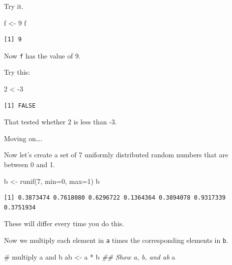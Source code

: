 \documentclass[
  letterpaper,
  DIV=11,
  numbers=noendperiod]{scrreprt}
\newenvironment{Shaded}{\begin{snugshade}}{\end{snugshade}}
\newcommand{\AttributeTok}[1]{\textcolor[rgb]{0.40,0.45,0.13}{#1}}
\newcommand{\CommentTok}[1]{\textcolor[rgb]{0.37,0.37,0.37}{#1}}
\newcommand{\DecValTok}[1]{\textcolor[rgb]{0.68,0.00,0.00}{#1}}
\newcommand{\DocumentationTok}[1]{\textcolor[rgb]{0.37,0.37,0.37}{\textit{#1}}}
\newcommand{\FunctionTok}[1]{\textcolor[rgb]{0.28,0.35,0.67}{#1}}
\newcommand{\NormalTok}[1]{\textcolor[rgb]{0.00,0.23,0.31}{#1}}
\newcommand{\OtherTok}[1]{\textcolor[rgb]{0.00,0.23,0.31}{#1}}
\newcommand{\SpecialCharTok}[1]{\textcolor[rgb]{0.37,0.37,0.37}{#1}}
\begin{document}
Try it.

\begin{Shaded}
\begin{Highlighting}[]
\NormalTok{f }\OtherTok{\textless{}{-}} \DecValTok{9}
\NormalTok{f}
\end{Highlighting}
\end{Shaded}

\begin{verbatim}
[1] 9
\end{verbatim}

Now \texttt{f} has the value of 9.

Try this:

\begin{Shaded}
\begin{Highlighting}[]
\DecValTok{2} \SpecialCharTok{\textless{}} \SpecialCharTok{{-}}\DecValTok{3}
\end{Highlighting}
\end{Shaded}

\begin{verbatim}
[1] FALSE
\end{verbatim}

That tested whether 2 is less than -3.

Moving on\ldots.

Now let's create a set of 7 uniformly distributed random numbers that
are between 0 and 1.

\begin{Shaded}
\begin{Highlighting}[]
\NormalTok{b }\OtherTok{\textless{}{-}} \FunctionTok{runif}\NormalTok{(}\DecValTok{7}\NormalTok{, }\AttributeTok{min=}\DecValTok{0}\NormalTok{, }\AttributeTok{max=}\DecValTok{1}\NormalTok{)}
\NormalTok{b}
\end{Highlighting}
\end{Shaded}

\begin{verbatim}
[1] 0.3873474 0.7618080 0.6296722 0.1364364 0.3894078 0.9317339 0.3751934
\end{verbatim}

These will differ every time you do this.

Now we multiply each element in \texttt{a} times the corresponding
elements in \texttt{b}.

\begin{Shaded}
\begin{Highlighting}[]
\CommentTok{\# multiply a and b}
\NormalTok{ab }\OtherTok{\textless{}{-}}\NormalTok{ a }\SpecialCharTok{*}\NormalTok{ b}
\DocumentationTok{\#\# Show a, b, and ab}
\NormalTok{a}
\end{Highlighting}
\end{Shaded}
\end{document}
